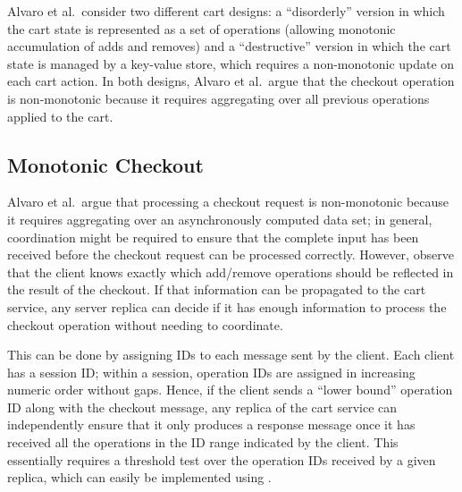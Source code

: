 Alvaro et al.\ consider two different cart designs: a ``disorderly'' version in
which the cart state is represented as a set of operations (allowing monotonic
accumulation of adds and removes) and a ``destructive'' version in which the
cart state is managed by a key-value store, which requires a non-monotonic
update on each cart action. In both designs, Alvaro et al.\ argue that the
checkout operation is non-monotonic because it requires aggregating over all
previous operations applied to the cart.

\subsection{Monotonic Checkout}
Alvaro et al.\ argue that processing a checkout request is non-monotonic because
it requires aggregating over an asynchronously computed data set; in general,
coordination might be required to ensure that the complete input has been
received before the checkout request can be processed correctly. However, observe
that the client knows exactly which add/remove operations should be reflected in
the result of the checkout. If that information can be propagated to the cart
service, any server replica can decide if it has enough information to process
the checkout operation without needing to coordinate.

This can be done by assigning IDs to each message sent by the client. Each
client has a session ID; within a session, operation IDs are assigned in
increasing numeric order without gaps. Hence, if the client sends a ``lower
bound'' operation ID along with the checkout message, any replica of the cart
service can independently ensure that it only produces a response message once
it has received all the operations in the ID range indicated by the client. This
essentially requires a threshold test over the operation IDs received by a given
replica, which can easily be implemented using \lang.


